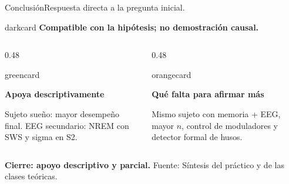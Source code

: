 \documentclass[aspectratio=169,10pt]{beamer}
\newcommand{\source}[1]{\vfill {\tiny\color{Muted}Fuente: #1}}
\newenvironment{card}[2][whitecard]{%
  \begin{beamercolorbox}[wd=#2,sep=0.20cm,rounded=true]{#1}\RaggedRight
}{\end{beamercolorbox}}
\begin{document}
\begin{frame}{Conclusión}{Respuesta directa a la pregunta inicial.}
\begin{center}
\begin{beamercolorbox}[wd=0.82\textwidth,sep=0.32cm,rounded=true]{darkcard}
{\LARGE \bfseries Compatible con la hipótesis; no demostración causal.}
\end{beamercolorbox}
\end{center}
\vspace{0.35cm}
\begin{columns}[T,totalwidth=\textwidth]
\begin{column}{0.48\textwidth}
\begin{card}[greencard]{\linewidth}
\textbf{Apoya descriptivamente}\par
Sujeto sueño: mayor desempeño final. EEG secundario: NREM con SWS y sigma en S2.
\end{card}
\end{column}
\begin{column}{0.48\textwidth}
\begin{card}[orangecard]{\linewidth}
\textbf{Qué falta para afirmar más}\par
Mismo sujeto con memoria + EEG, mayor $n$, control de moduladores y detector formal de husos.
\end{card}
\end{column}
\end{columns}
\vspace{0.35cm}
\centering\textbf{Cierre: apoyo descriptivo y parcial.}
\source{Síntesis del práctico y de las clases teóricas.}
\end{frame}
\end{document}
